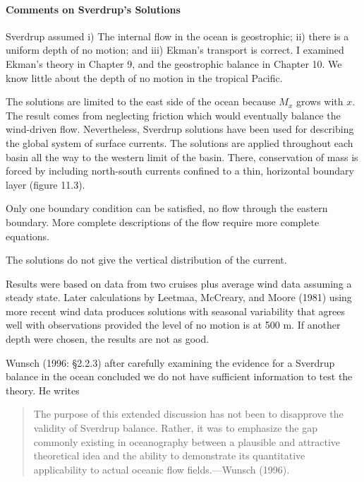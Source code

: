 \paragraph{Comments on Sverdrup's Solutions}
\begin{enumerate}
\vitem Sverdrup assumed i) The internal
flow in the ocean is geostrophic; ii) there is a uniform depth of no
motion; and iii) Ekman's transport is
correct. I examined Ekman's theory in Chapter 9, and the geostrophic
balance in Chapter 10. We know little about the depth of no motion in
the tropical Pacific.

\vitem The solutions are limited to the east side of the ocean because
$M_x$ grows with $x$. The result comes from neglecting friction which
would eventually balance the wind-driven flow. Nevertheless, Sverdrup
solutions have been used for describing the global system of surface
currents. The solutions are applied throughout each basin all the way
to the western limit of the basin.  There, conservation of mass is
forced by including north-south currents confined to a thin,
horizontal boundary layer (figure 11.3).

\vitem Only one boundary condition can be satisfied, no flow through
the eastern boundary. More complete descriptions of the flow require
more complete equations.

\vitem The solutions do not give the vertical distribution of the
current.

\vitem Results were based on data from two cruises plus average wind
data assuming a steady state. Later calculations by Leetmaa, McCreary,
and Moore (1981) using more recent wind data produces solutions with
seasonal variability that agrees well with observations provided the
level of no motion is at 500 m. If another depth were chosen, the
results are not as good.

\vitem Wunsch (1996: \S 2.2.3) after carefully examining the evidence
for a Sverdrup balance in the ocean concluded we do not have
sufficient information to test the theory. He writes
\begin{quote} \small
The purpose of this extended discussion has not been to disapprove the
validity of Sverdrup balance. Rather, it was to emphasize the gap
commonly existing in oceanography between a plausible and attractive
theoretical idea and the ability to demonstrate its quantitative
applicability to actual oceanic flow fields.---Wunsch (1996).
\end{quote}


\end{enumerate}
